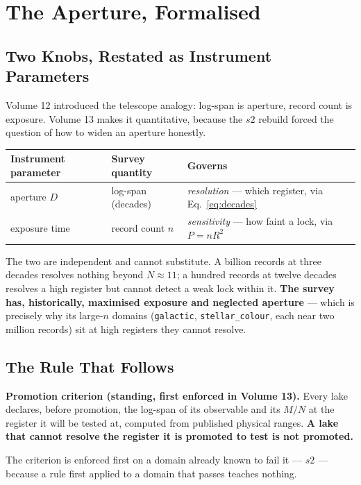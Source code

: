 \documentclass[11pt, letterpaper, openany]{book}
\newcommand{\MN}{M/N}
\begin{document}
\chapter{The Aperture, Formalised}

\section{Two Knobs, Restated as Instrument Parameters}

Volume 12 introduced the telescope analogy: log-span is aperture, record count is exposure.
Volume 13 makes it quantitative, because the $s2$ rebuild forced the question of how to widen
an aperture honestly.

\begin{table}[H]
\centering
\small
\begin{tabular}{@{}lll@{}}
\toprule
\textbf{Instrument parameter} & \textbf{Survey quantity} & \textbf{Governs} \\
\midrule
aperture $D$ & log-span (decades) & \emph{resolution} --- which register, via Eq.~\ref{eq:decades} \\
exposure time & record count $n$ & \emph{sensitivity} --- how faint a lock, via $P = nR^2$ \\
\bottomrule
\end{tabular}
\end{table}

The two are independent and cannot substitute. A billion records at three decades resolves
nothing beyond $N \approx 11$; a hundred records at twelve decades resolves a high register but
cannot detect a weak lock within it. \textbf{The survey has, historically, maximised exposure
and neglected aperture} --- which is precisely why its large-$n$ domains (\texttt{galactic},
\texttt{stellar\_colour}, each near two million records) sit at high registers they cannot
resolve.

\section{The Rule That Follows}

\begin{predictionbox}
\textbf{Promotion criterion (standing, first enforced in Volume 13).} Every lake declares, before
promotion, the log-span of its observable and its $\MN$ at the register it will be tested at,
computed from published physical ranges. \textbf{A lake that cannot resolve the register it is
promoted to test is not promoted.}

\medskip
\noindent The criterion is enforced first on a domain already known to fail it --- $s2$ ---
because a rule first applied to a domain that passes teaches nothing.
\end{predictionbox}
\end{document}
